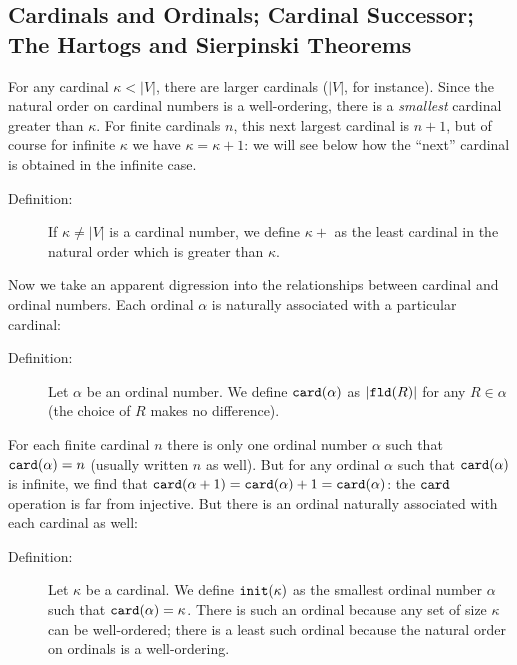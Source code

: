\documentclass[12pt]{book}
\begin{document}
\newpage

\subsection{Cardinals and Ordinals; Cardinal Successor; The Hartogs and Sierpinski Theorems}

For any cardinal $\kappa<|V|$, there are larger cardinals ($|V|$, for
instance).  Since the natural order on cardinal numbers is a
well-ordering, there is a {\em smallest\/} cardinal greater than
$\kappa$.  For finite cardinals $n$, this next largest cardinal is
$n+1$, but of course for infinite $\kappa$ we have $\kappa=\kappa+1$:
we will see below how the ``next'' cardinal is obtained in the
infinite case.

\begin{description}

\item[Definition:] If $\kappa \neq |V|$ is a cardinal number, we
define $\kappa+$ as the least cardinal in the natural order which is
greater than $\kappa$.

\end{description}

Now we take an apparent digression into the relationships between
cardinal and ordinal numbers.  Each ordinal $\alpha$ is naturally
associated with a particular cardinal:

\begin{description}

\item[Definition:] Let $\alpha$ be an ordinal number.  We define ${\tt
card}(\alpha)$ as $|{\tt fld}(R)|$ for any $R \in \alpha$ (the choice
of $R$ makes no difference).

\end{description}

For each finite cardinal $n$ there is only one ordinal number $\alpha$
such that ${\tt card}(\alpha)=n$ (usually written $n$ as well).  But
for any ordinal $\alpha$ such that ${\tt card}(\alpha)$ is infinite,
we find that ${\tt card}(\alpha+1) = {\tt card}(\alpha)+1 = {\tt
card}(\alpha)$: the ${\tt card}$ operation is far from injective.  But
there is an ordinal naturally associated with each cardinal as well:

\begin{description}

\item[Definition:] Let $\kappa$ be a cardinal.  We define ${\tt
init}(\kappa)$ as the smallest ordinal number $\alpha$ such that ${\tt
card}(\alpha)=\kappa$.  There is such an ordinal because any set of
size $\kappa$ can be well-ordered; there is a least such ordinal
because the natural order on ordinals is a well-ordering.

\end{description}
\end{document}

